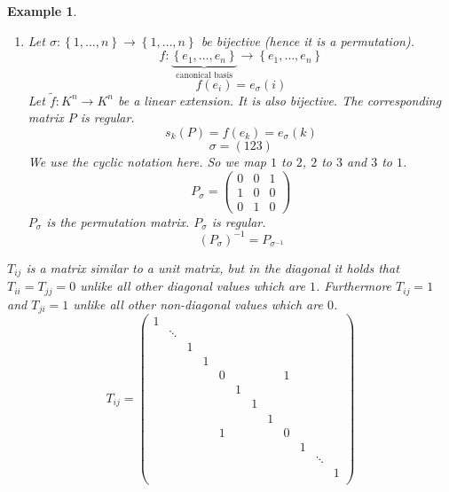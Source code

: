 \documentclass[a4paper,landscape,twocolumn]{article}
\newcommand\set[1]{\left\{#1\right\}}
\newtheorem{ex}{Example}[section]
\begin{document}
\begin{ex}
\begin{enumerate}
\[\begin{bmatrix}
          a_1 & \ldots & 0 \\
          \vdots & \ddots & \vdots \\
          0 & \ldots & a_n
        \end{bmatrix}
        =
        \begin{bmatrix}
          \frac1{a_1} & \ldots & 0 \\
          \vdots & \ddots & \vdots \\
          0 & \ldots & \frac1{a_n}
        \end{bmatrix}
      \]
    \item Let $\sigma: \set{1, \ldots, n} \to \set{1, \ldots, n}$ be bijective
      (hence it is a permutation).
      \[ f: \underbrace{\set{e_1, \ldots, e_n}}_{\text{canonical basis}} \to \set{e_1, \ldots, e_n} \]
      \[ f(e_i) = e_\sigma(i) \]
      Let $\tilde f: K^n \to K^n$ be a linear extension. It is also bijective.
      The corresponding matrix $P$ is regular.
      \[ s_k(P) = f(e_k) = e_\sigma(k) \]
      \[ \sigma = (1 2 3) \]
      We use the cyclic notation here. So we map $1$ to $2$, $2$ to $3$ and $3$ to $1$.
      \[
        P_\sigma = \begin{pmatrix}
          0 & 0 & 1 \\
          1 & 0 & 0 \\
          0 & 1 & 0
        \end{pmatrix}
      \]
      $P_\sigma$ is the \emph{permutation matrix}. $P_\sigma$ is regular.
      \[ \left(P_\sigma\right)^{-1} = P_{\sigma^{-1}} \]
  \end{enumerate}

  $T_{ij}$ is a matrix similar to a unit matrix, but in the diagonal it holds
  that $T_{ii} = T_{jj} = 0$ unlike all other diagonal values which are $1$.
  Furthermore $T_{ij} = 1$ and $T_{ji} = 1$ unlike all other non-diagonal values
  which are $0$.
  \[
    T_{ij} =
    \begin{pmatrix}
      1 &        &   &   &   &   &   &   &   &   &   & \\
        & \ddots &   &   &   &   &   &   &   &   &   & \\
        &        & 1 &   &   &   &   &   &   &   &   & \\
        &        &   & 1 &   &   &   &   &   &   &   & \\
        &        &   &   & 0 &   &   &   & 1 &   &   & \\
        &        &   &   &   & 1 &   &   &   &   &   & \\
        &        &   &   &   &   & 1 &   &   &   &   & \\
        &        &   &   &   &   &   & 1 &   &   &   & \\
        &        &   &   & 1 &   &   &   & 0 &   &   & \\
        &        &   &   &   &   &   &   &   & 1 &   & \\
        &        &   &   &   &   &   &   &   &   & \ddots & \\
        &        &   &   &   &   &   &   &   &   &   & 1 \\
    \end{pmatrix}
  \]
\end{ex}
\end{document}
